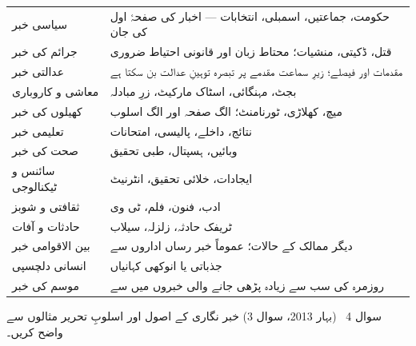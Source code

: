 \begin{hal}
\begin{center}
\begin{tabular}{@{}p{3.6cm} p{10.8cm}@{}}
\toprule
سیاسی خبر & حکومت، جماعتیں، اسمبلی، انتخابات --- اخبار کی صفحۂ اول کی جان \\
جرائم کی خبر & قتل، ڈکیتی، منشیات؛ محتاط زبان اور قانونی احتیاط ضروری \\
عدالتی خبر & مقدمات اور فیصلے؛ زیرِ سماعت مقدمے پر تبصرہ توہینِ عدالت بن سکتا ہے \\
معاشی و کاروباری & بجٹ، مہنگائی، اسٹاک مارکیٹ، زرِ مبادلہ \\
کھیلوں کی خبر & میچ، کھلاڑی، ٹورنامنٹ؛ الگ صفحہ اور الگ اسلوب \\
تعلیمی خبر & نتائج، داخلے، پالیسی، امتحانات \\
صحت کی خبر & وبائیں، ہسپتال، طبی تحقیق \\
سائنس و ٹیکنالوجی & ایجادات، خلائی تحقیق، انٹرنیٹ \\
ثقافتی و شوبز & ادب، فنون، فلم، ٹی وی \\
حادثات و آفات & ٹریفک حادثہ، زلزلہ، سیلاب \\
بین الاقوامی خبر & دیگر ممالک کے حالات؛ عموماً خبر رساں اداروں سے \\
انسانی دلچسپی & جذباتی یا انوکھی کہانیاں \\
موسم کی خبر & روزمرہ کی سب سے زیادہ پڑھی جانے والی خبروں میں سے \\
\bottomrule
\end{tabular}
\end{center}

\end{hal}

\begin{sawal}{سوال \textenglish{4} \ \textnormal{\small(بہار \textenglish{2013}، سوال \textenglish{3})}}
خبر نگاری کے اصول اور اسلوبِ تحریر مثالوں سے واضح کریں۔
\end{sawal}

